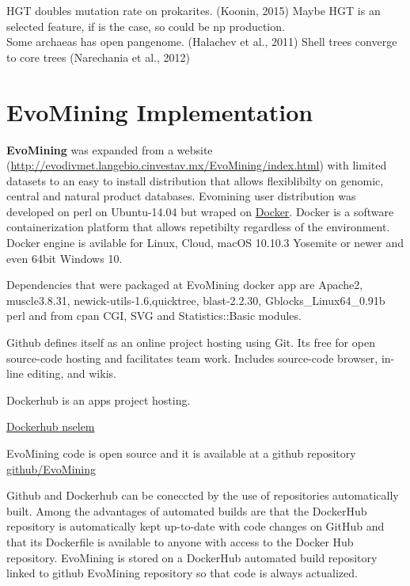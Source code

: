 \documentclass[12pt,twoside]{reedthesis}
\begin{document}
  HGT doubles mutation rate on prokarites. (Koonin, 2015) Maybe HGT is an
  selected feature, if is the case, so could be np production.\\
  Some archaeas has open pangenome. (Halachev et al., 2011) Shell trees
  converge to core trees (Narechania et al., 2012)
  
  \section{EvoMining Implementation}\label{evomining-implementation}
  
  \textbf{EvoMining} was expanded from a website
  (\url{http://evodivmet.langebio.cinvestav.mx/EvoMining/index.html}) with
  limited datasets to an easy to install distribution that allows
  flexiblibilty on genomic, central and natural product databases.
  Evomining user distribution was developed on perl on Ubuntu-14.04 but
  wraped on \href{https://www.docker.com/}{Docker}. Docker is a software
  containerization platform that allows repetibilty regardless of the
  environment. Docker engine is avilable for Linux, Cloud, macOS 10.10.3
  Yosemite or newer and even 64bit Windows 10.
  
  Dependencies that were packaged at EvoMining docker app are Apache2,
  muscle3.8.31, newick-utils-1.6,quicktree, blast-2.2.30,
  Gblocks\_Linux64\_0.91b perl and from cpan CGI, SVG and
  Statistics::Basic modules.
  
  Github defines itself as an online project hosting using Git. Its free
  for open source-code hosting and facilitates team work. Includes
  source-code browser, in-line editing, and wikis.
  
  Dockerhub is an apps project hosting.
  
  \href{https://hub.docker.com/u/nselem/}{Dockerhub nselem}
  
  EvoMining code is open source and it is available at a github repository
  \href{https://github.com/nselem/EvoMining}{github/EvoMining}
  
  Github and Dockerhub can be coneccted by the use of repositories
  automatically built. Among the advantages of automated builds are that
  the DockerHub repository is automatically kept up-to-date with code
  changes on GitHub and that its Dockerfile is available to anyone with
  access to the Docker Hub repository. EvoMining is stored on a DockerHub
  automated build repository linked to github EvoMining repository so that
  code is always actualized.
  
\end{document}
